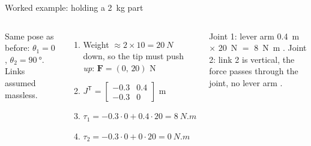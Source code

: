 \documentclass[aspectratio=169,10pt]{beamer}
\newcommand{\arm}[3]{%
  \draw[#3] (0,0) -- ++(#1:2.4) coordinate (E) -- ++(#1+#2:1.8) coordinate (T);
  \node[jnt] at (0,0) {}; \node[jnt] at (E) {}; \fill[mkOrange] (T) circle (1.6pt);}
\newcommand{\base}{\fill[pattern=north east lines,pattern color=mkGray] (-.35,-.25) rectangle (.35,-.08);
  \draw[mkGray,line width=.8pt] (-.35,-.08) -- (.35,-.08);}
\begin{document}
\begin{frame}[t]{Worked example: holding a \SI{2}{kg} part}
\begin{columns}[T,onlytextwidth]
\small
Same pose as before: $\theta_1=0$, $\theta_2=\SI{90}{\degree}$. Links assumed massless.
\begin{enumerate}
\item Weight $\approx 2\times10=\SI{20}{N}$ down, so the tip must push \emph{up}: $\bm F=(0,\,20)$ N
\item $J^\mathsf{T}=\begin{bmatrix} -0.3 & 0.4\\ -0.3 & 0\end{bmatrix}$ m
\item $\tau_1=-0.3\cdot0+0.4\cdot20=\SI{8}{N.m}$
\item $\tau_2=-0.3\cdot0+0\cdot20=\SI{0}{N.m}$
\end{enumerate}
\begin{keybox}
Joint 1: lever arm \SI{0.4}{m} $\times$ \SI{20}{N} $=$ \SI{8}{N.m} \checkmark.
Joint 2: link 2 is vertical, the force passes through the joint, no lever arm \checkmark.
\end{keybox}
\centering
{}
\end{columns}
\end{frame}
\end{document}
